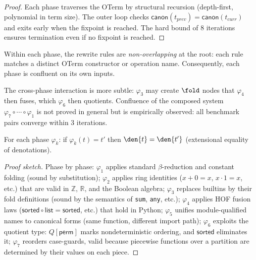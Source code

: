 \begin{proof}
Each phase traverses the OTerm by structural recursion (depth-first,
polynomial in term size).  The outer loop checks
$\mathsf{canon}(t_{\mathit{prev}}) = \mathsf{canon}(t_{\mathit{curr}})$
and exits early when the fixpoint is reached.  The hard bound of 8
iterations ensures termination even if no fixpoint is reached.
\end{proof}

\begin{proposition}
\label{prop:normalizer-confluence}
Within each phase, the rewrite rules are \emph{non-overlapping}
at the root: each rule matches a distinct OTerm constructor or
operation name.  Consequently, each phase is confluent on its own
inputs.
\end{proposition}

The cross-phase interaction is more subtle: $\varphi_3$ may create
$\fold$ nodes that $\varphi_4$ then fuses, which $\varphi_6$ then
quotients.  Confluence of the composed system $\varphi_7 \circ
\cdots \circ \varphi_1$ is not proved in general but is empirically
observed: all benchmark pairs converge within 3 iterations.

\begin{proposition}
\label{prop:phase-soundness}
For each phase $\varphi_k$: if $\varphi_k(t) = t'$ then
$\den{t} = \den{t'}$ (extensional equality of denotations).
\end{proposition}

\begin{proof}[Proof sketch]
Phase by phase:
$\varphi_1$ applies standard $\beta$-reduction and constant folding
(sound by substitution);
$\varphi_2$ applies ring identities ($x + 0 = x$, $x \cdot 1 = x$,
etc.) that are valid in $\mathbb{Z}$, $\mathbb{R}$, and the
Boolean algebra;
$\varphi_3$ replaces builtins by their fold definitions (sound by
the semantics of \texttt{sum}, \texttt{any}, etc.);
$\varphi_4$ applies HOF fusion laws ($\mathsf{sorted} \circ
\mathsf{list} = \mathsf{sorted}$, etc.) that hold in Python;
$\varphi_5$ unifies module-qualified names to canonical forms (same
function, different import path);
$\varphi_6$ exploits the quotient type: $Q[\mathsf{perm}]$ marks
nondeterministic ordering, and $\mathsf{sorted}$ eliminates it;
$\varphi_7$ reorders case-guards, valid because piecewise functions
over a partition are determined by their values on each piece.
\end{proof}


